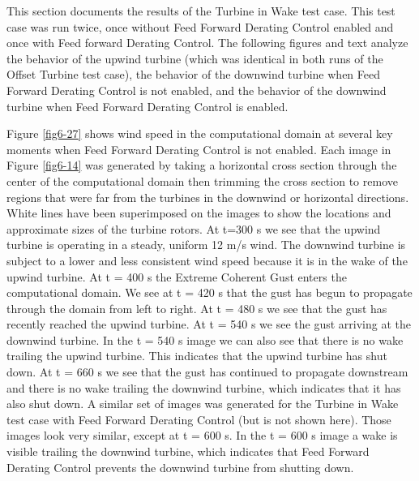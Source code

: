 This section documents the results of the Turbine in Wake test case. This test case was run twice, once without Feed Forward Derating Control enabled and once with Feed forward Derating Control. The following figures and text analyze the behavior of the upwind turbine (which was identical in both runs of the Offset Turbine test case), the behavior of the downwind turbine when Feed Forward Derating Control is not enabled, and the behavior of the downwind turbine when Feed Forward Derating Control is enabled.

Figure \ref{fig6-27} shows wind speed in the computational domain at several key moments when Feed Forward Derating Control is not enabled. Each image in Figure \ref{fig6-14} was generated by taking a horizontal cross section through the center of the computational domain then trimming the cross section to remove regions that were far from the turbines in the downwind or horizontal directions. White lines have been superimposed on the images to show the locations and approximate sizes of the turbine rotors. At t=300 s we see that the upwind turbine is operating in a steady, uniform 12 m/s wind. The downwind turbine is subject to a lower and less consistent wind speed because it is in the wake of the upwind turbine. At t = 400 s the Extreme Coherent Gust enters the computational domain. We see at t = 420 s that the gust has begun to propagate through the domain from left to right. At t = 480 s we see that the gust has recently reached the upwind turbine. At t = 540 s we see the gust arriving at the downwind turbine. In the t = 540 s image we can also see that there is no wake trailing the upwind turbine. This indicates that the upwind turbine has shut down. At t = 660 s we see that the gust has continued to propagate downstream and there is no wake trailing the downwind turbine, which indicates that it has also shut down. A similar set of images was generated for the Turbine in Wake test case with Feed Forward Derating Control (but is not shown here). Those images look very similar, except at t = 600 s. In the t = 600 s image a wake is visible trailing the downwind turbine, which indicates that Feed Forward Derating Control prevents the downwind turbine from shutting down.

